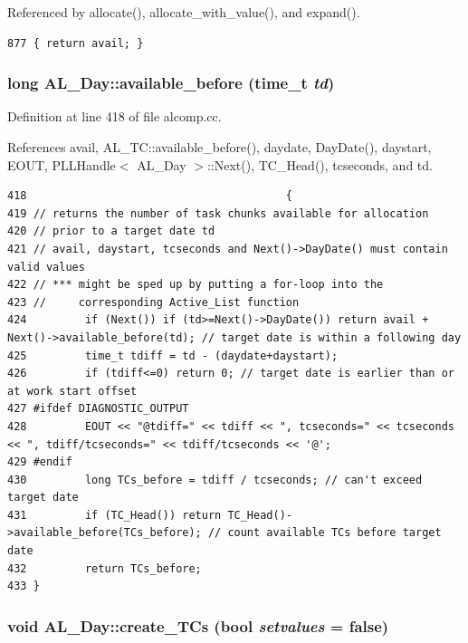 Referenced by allocate(), allocate\_\-with\_\-value(), and expand().



\footnotesize\begin{verbatim}877 { return avail; }
\end{verbatim}\normalsize 
{}
\subsubsection{\setlength{\rightskip}{0pt plus 5cm}long AL\_\-Day::available\_\-before (time\_\-t {\em td})}\label{classAL__Day_a15}




Definition at line 418 of file alcomp.cc.

References avail, AL\_\-TC::available\_\-before(), daydate, Day\-Date(), daystart, EOUT, PLLHandle$<$ AL\_\-Day $>$::Next(), TC\_\-Head(), tcseconds, and td.



\footnotesize\begin{verbatim}418                                        {
419 // returns the number of task chunks available for allocation
420 // prior to a target date td
421 // avail, daystart, tcseconds and Next()->DayDate() must contain valid values
422 // *** might be sped up by putting a for-loop into the
423 //     corresponding Active_List function
424         if (Next()) if (td>=Next()->DayDate()) return avail + Next()->available_before(td); // target date is within a following day
425         time_t tdiff = td - (daydate+daystart);
426         if (tdiff<=0) return 0; // target date is earlier than or at work start offset
427 #ifdef DIAGNOSTIC_OUTPUT
428         EOUT << "@tdiff=" << tdiff << ", tcseconds=" << tcseconds << ", tdiff/tcseconds=" << tdiff/tcseconds << '@';
429 #endif
430         long TCs_before = tdiff / tcseconds; // can't exceed target date
431         if (TC_Head()) return TC_Head()->available_before(TCs_before); // count available TCs before target date
432         return TCs_before;
433 }
\end{verbatim}\normalsize 
{}
\subsubsection{\setlength{\rightskip}{0pt plus 5cm}void AL\_\-Day::create\_\-TCs (bool {\em setvalues} = {\bf false})}\label{classAL__Day_a17}




